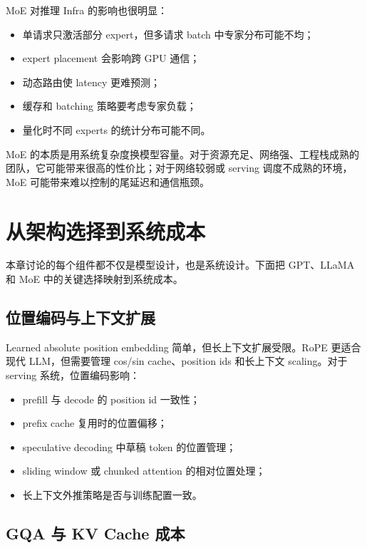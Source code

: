 MoE 对推理 Infra 的影响也很明显：

\begin{itemize}
\item 单请求只激活部分 expert，但多请求 batch 中专家分布可能不均；
\item expert placement 会影响跨 GPU 通信；
\item 动态路由使 latency 更难预测；
\item 缓存和 batching 策略要考虑专家负载；
\item 量化时不同 experts 的统计分布可能不同。
\end{itemize}

MoE 的本质是用系统复杂度换模型容量。对于资源充足、网络强、工程栈成熟的团队，它可能带来很高的性价比；对于网络较弱或 serving 调度不成熟的环境，MoE 可能带来难以控制的尾延迟和通信瓶颈。

\section{从架构选择到系统成本}
\label{sec:architecture-choice-to-system-cost}

本章讨论的每个组件都不仅是模型设计，也是系统设计。下面把 GPT、LLaMA 和 MoE 中的关键选择映射到系统成本。

\subsection{位置编码与上下文扩展}
\label{subsec:position-encoding-system-cost}

Learned absolute position embedding 简单，但长上下文扩展受限。RoPE 更适合现代 LLM，但需要管理 cos/sin cache、position ids 和长上下文 scaling。对于 serving 系统，位置编码影响：

\begin{itemize}
\item prefill 与 decode 的 position id 一致性；
\item prefix cache 复用时的位置偏移；
\item speculative decoding 中草稿 token 的位置管理；
\item sliding window 或 chunked attention 的相对位置处理；
\item 长上下文外推策略是否与训练配置一致。
\end{itemize}

\subsection{GQA 与 KV Cache 成本}
\label{subsec:gqa-kv-cache-system-cost}

